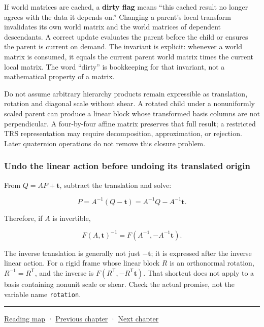 If world matrices are cached, a \textbf{dirty flag} means ``this cached result no longer agrees with the data it depends on.'' Changing a parent's local transform invalidates its own world matrix and the world matrices of dependent descendants. A correct update evaluates the parent before the child or ensures the parent is current on demand. The invariant is explicit: whenever a world matrix is consumed, it equals the current parent world matrix times the current local matrix. The word ``dirty'' is bookkeeping for that invariant, not a mathematical property of a matrix.

Do not assume arbitrary hierarchy products remain expressible as translation, rotation and diagonal scale without shear. A rotated child under a nonuniformly scaled parent can produce a linear block whose transformed basis columns are not perpendicular. A four-by-four affine matrix preserves that full result; a restricted TRS representation may require decomposition, approximation, or rejection. Later quaternion operations do not remove this closure problem.

\subsubsection{Undo the linear action before undoing its translated origin}\label{01-foundations-i-ch018-undo-the-linear-action-before-undoing-its-translated-origin}

From \(Q=AP+\mathbf t\), subtract the translation and solve:

\[
P=A^{-1}(Q-\mathbf t)=A^{-1}Q-A^{-1}\mathbf t.
\]

Therefore, if \(A\) is invertible,

\[
F(A,\mathbf t)^{-1}
=F(A^{-1},-A^{-1}\mathbf t).
\]

The inverse translation is generally not just \(-\mathbf t\); it is expressed after the inverse linear action. For a rigid frame whose linear block \(R\) is an orthonormal rotation, \(R^{-1}=R^{\mathsf T}\), and the inverse is \(F(R^{\mathsf T},-R^{\mathsf T}\mathbf t)\). That shortcut does not apply to a basis containing nonunit scale or shear. Check the actual promise, not the variable name \texttt{rotation}.

\begin{center}\rule{0.5\linewidth}{0.5pt}\end{center}

\hyperref[volume-reading-map]{Reading map} · \hyperref[01-foundations-i-ch017-python-and-numerical-tools-for-graphics-systems]{Previous chapter} · \hyperref[01-foundations-i-ch019-coordinate-frames-and-linear-systems]{Next chapter}
